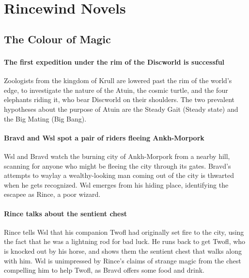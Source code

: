 \chapter{Rincewind Novels}

\section{The Colour of Magic}

\subsection{}
\subsubsection{The first expedition under the rim of the Discworld is successful}
Zoologists from the kingdom of Krull are lowered past the rim of the world's edge, to investigate
the nature of the \Gls{Atuin}, the cosmic turtle, and the four elephants riding it, who bear
Discworld on their shoulders. The two prevalent hypotheses about the purpose of \Gls{Atuin} are the
Steady Gait (Steady state) and the Big Mating (Big Bang).

\subsubsection{\Gls{Bravd} and \Gls{Wsl} spot a pair of riders fleeing Ankh-Morpork}
\Gls{Wsl} and \Gls{Bravd} watch the burning city of Ankh-Morpork from a nearby hill, scanning for
anyone who might be fleeing the city through its gates. \Gls{Bravd}'s attempts to waylay a
wealthy-looking man coming out of the city is thwarted when he gets recognized. \Gls{Wsl} emerges
from his hiding place, identifying the escapee as \Gls{Rince}, a poor wizard.

\subsubsection{\Gls{Rince} talks about the sentient chest}
\Gls{Rince} tells \Gls{Wsl} that his companion \Gls{Twofl} had originally set fire to the city,
using the fact that he was a lightning rod for bad luck. He runs back to get \Gls{Twofl}, who is
knocked out by his horse, and shows them the sentient chest that walks along with him. \Gls{Wsl}
is unimpressed by \Gls{Rince}'s claims of strange magic from the chest compelling him to help
\Gls{Twofl}, as \Gls{Bravd} offers some food and drink.

